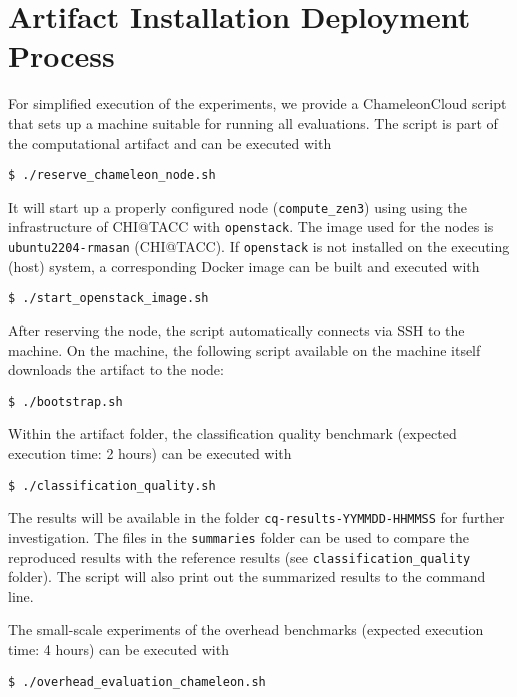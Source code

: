\documentclass[twoside]{article}
\begin{document}

\section*{Artifact Installation Deployment Process}


For simplified execution of the experiments, we provide a ChameleonCloud script that sets up a machine suitable for running all evaluations.
The script is part of the computational artifact and can be executed with
{
\small
\begin{verbatim}
$ ./reserve_chameleon_node.sh
\end{verbatim}
}
It will start up a properly configured node (\texttt{compute\_zen3}) using using the infrastructure of CHI@TACC with \texttt{openstack}. The image used for the nodes is \texttt{ubuntu2204-rmasan} (CHI@TACC).
If \texttt{openstack} is not installed on the executing (host) system, a corresponding Docker image can be built and executed with
{
\small
\begin{verbatim}
$ ./start_openstack_image.sh
\end{verbatim}
}
After reserving the node, the script automatically connects via SSH to the machine.
On the machine, the following script available on the machine itself downloads the artifact to the node:
{
\small
\begin{verbatim}
$ ./bootstrap.sh
\end{verbatim}
}

Within the artifact folder, the classification quality benchmark (expected execution time: 2 hours) can be executed with
{
\small
\begin{verbatim}
$ ./classification_quality.sh
\end{verbatim}
}

The results will be available in the folder \texttt{cq-results-YYMMDD-HHMMSS} for further investigation. The files in the \texttt{summaries} folder can be used to compare the reproduced results with the reference results (see \texttt{classification\_quality} folder).
The script will also print out the summarized results to the command line.

The small-scale experiments of the overhead benchmarks (expected execution time: 4 hours) can be executed with
{
\small
\begin{verbatim}
$ ./overhead_evaluation_chameleon.sh
\end{verbatim}
}
\end{document}
